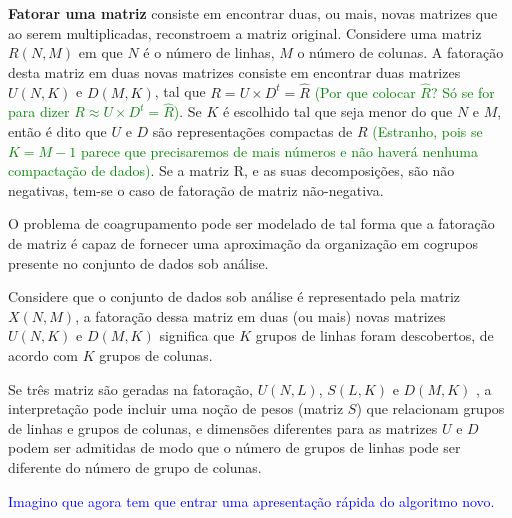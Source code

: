 \documentclass[
    12pt,                %
    oneside,            %
    a4paper,            %
    english,            %
    brazil                %
    ]{abntex2ppgsi}
\begin{document}

\textbf{Fatorar uma matriz} consiste em encontrar duas, ou mais, novas matrizes que ao serem multiplicadas, reconstroem a matriz original. Considere uma matriz $R(N,M)$ em que $N$ é o número de linhas, $M$ o número de colunas. A fatoração desta matriz em duas novas matrizes consiste em encontrar duas matrizes $U(N,K)$ e $D(M,K)$, tal que $ R = U \times D^t = \hat{R} $ \textcolor{green}{(Por que colocar $\hat{R}$? Só se for para dizer $ R \approx U \times D^t = \hat{R} $)}. Se $K$ é escolhido tal que seja menor do que $N$ e $M$, então é dito que $U$ e $D$ são representações compactas de $R$ \textcolor{green}{(Estranho, pois se $K=M-1$ parece que precisaremos de mais números e não haverá nenhuma compactação de dados)}. Se a matriz R, e as suas decomposições, são não negativas, tem-se o caso de  fatoração de matriz não-negativa.


O problema de coagrupamento pode ser modelado de tal forma que a fatoração de matriz é capaz de fornecer uma aproximação da organização em cogrupos presente no conjunto de dados sob análise.

Considere que o conjunto de dados sob análise é representado pela matriz $X(N,M)$, a fatoração dessa matriz em duas (ou mais) novas matrizes $U(N,K)$ e $D(M,K)$ significa que $K$ grupos de linhas foram descobertos, de acordo com $K$ grupos de colunas.


Se três matriz são geradas na fatoração, $U(N,L)$, $S(L,K)$ e $D(M,K)$ , a interpretação pode incluir uma noção de pesos (matriz $S$) que relacionam grupos de linhas e grupos de colunas, e dimensões diferentes para as matrizes $U$ e $D$ podem ser admitidas de modo que o número de grupos de linhas pode ser diferente do número de grupo de colunas.


\textcolor{blue}{Imagino que agora tem que entrar uma apresentação rápida do algoritmo novo.}
\end{document}

